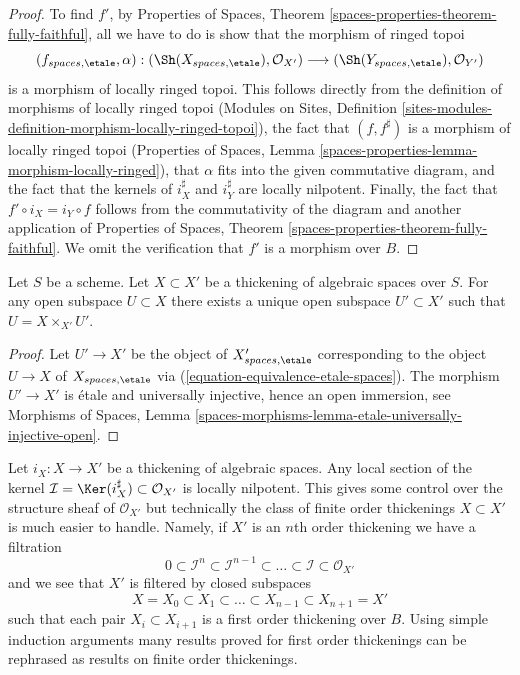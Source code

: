 \begin{proof}
To find $f'$, by
Properties of Spaces, Theorem \ref{spaces-properties-theorem-fully-faithful},
all we have to do is show that the morphism of ringed topoi
$$
(f_{spaces, \etale}, \alpha) :
(\Sh(X_{spaces, \etale}), \mathcal{O}_{X'})
\longrightarrow
(\Sh(Y_{spaces, \etale}), \mathcal{O}_{Y'})
$$
is a morphism of locally ringed topoi. This follows directly
from the definition of morphisms of locally ringed topoi
(Modules on Sites,
Definition \ref{sites-modules-definition-morphism-locally-ringed-topoi}),
the fact that $(f, f^\sharp)$ is a morphism of locally ringed topoi
(Properties of Spaces,
Lemma \ref{spaces-properties-lemma-morphism-locally-ringed}),
that $\alpha$ fits into the given commutative diagram, and
the fact that the kernels of $i_X^\sharp$ and $i_Y^\sharp$ are
locally nilpotent. Finally, the fact that $f' \circ i_X = i_Y \circ f$
follows from the commutativity of the diagram and another application of
Properties of Spaces, Theorem \ref{spaces-properties-theorem-fully-faithful}.
We omit the verification that $f'$ is a morphism over $B$.
\end{proof}

\begin{lemma}
\label{lemma-open-subspace-thickening}
Let $S$ be a scheme. Let $X \subset X'$ be a thickening
of algebraic spaces over $S$. For any open subspace $U \subset X$ there
exists a unique open subspace $U' \subset X'$ such that
$U = X \times_{X'} U'$.
\end{lemma}

\begin{proof}
Let $U' \to X'$ be the object of $X'_{spaces, \etale}$
corresponding to the object $U \to X$ of $X_{spaces, \etale}$
via (\ref{equation-equivalence-etale-spaces}). The morphism
$U' \to X'$ is \'etale and universally injective, hence an open immersion, see
Morphisms of Spaces,
Lemma \ref{spaces-morphisms-lemma-etale-universally-injective-open}.
\end{proof}

\noindent
Let $i_X : X \to X'$ be a thickening of algebraic spaces. Any local section
of the kernel $\mathcal{I} = \Ker(i_X^\sharp) \subset \mathcal{O}_{X'}$ is
locally nilpotent. This gives some control over the structure sheaf
of $\mathcal{O}_{X'}$ but technically the class of finite order
thickenings $X \subset X'$ is much easier to handle.
Namely, if $X'$ is an $n$th order thickening we have a filtration
$$
0 \subset \mathcal{I}^n \subset \mathcal{I}^{n - 1} \subset
\ldots \subset \mathcal{I} \subset \mathcal{O}_{X'}
$$
and we see that $X'$ is filtered by closed subspaces
$$
X = X_0 \subset X_1 \subset \ldots \subset X_{n - 1} \subset X_{n + 1} = X'
$$
such that each pair $X_i \subset X_{i + 1}$ is a first order thickening
over $B$. Using simple induction arguments many results proved for first order
thickenings can be rephrased as results on finite order thickenings.

